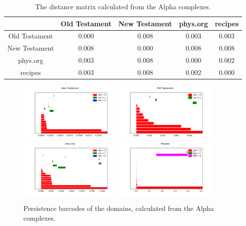 \documentclass[12pt,a4paper]{amsart}
\begin{document}
\begin{table}
  \centering
  \begin{tabular}{c|cccc}
                  & Old Testament & New Testament & phys.org & recipes \\ \hline
    Old Testament & 0.000 & 0.008 & 0.003 & 0.003 \\
    New Testament & 0.008 & 0.000 & 0.008 & 0.008 \\
    phys.org      & 0.003 & 0.008 & 0.000 & 0.002 \\
    recipes       & 0.003 & 0.008 & 0.002 & 0.000 \\
  \end{tabular}

  \caption{The distance matrix calculated from the Alpha complexes.}
  \label{tab:alpha}
\end{table}

\begin{figure}
  \centering
  \includegraphics[width=0.45\textwidth]{../plots/barcodes/bible-new-alpha}
  \includegraphics[width=0.45\textwidth]{../plots/barcodes/bible-old-alpha}
  \includegraphics[width=0.45\textwidth]{../plots/barcodes/phys-alpha}
  \includegraphics[width=0.45\textwidth]{../plots/barcodes/recipes-alpha}
  \caption{Persistence barcodes of the domains, calculated from the Alpha
    complexes.}
  \label{fig:barcode:alpha}
\end{figure}
\end{document}

